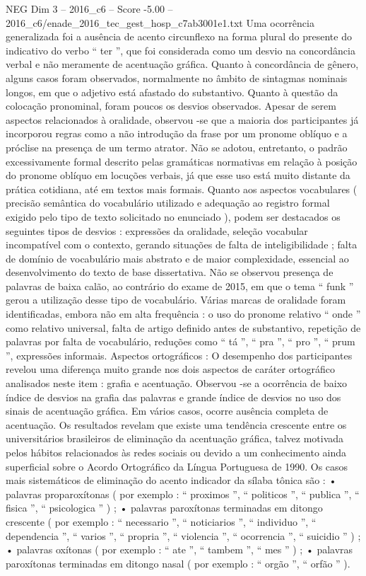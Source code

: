 \begin{textsample}{NEG Dim 3 – 2016\_c6 – Score -5.00 – 2016\_c6/enade\_2016\_tec\_gest\_hosp\_c7ab3001e1.txt}
Uma ocorrência generalizada foi a ausência de acento circunflexo na forma plural do presente do indicativo do verbo “ ter ”, que foi considerada como um desvio na concordância verbal e não meramente de acentuação gráfica.
Quanto à concordância de gênero, alguns casos foram observados, normalmente no âmbito de sintagmas nominais longos, em que o adjetivo está afastado do substantivo.
Quanto à questão da colocação pronominal, foram poucos os desvios observados.
Apesar de serem aspectos relacionados à oralidade, observou -se que a maioria dos participantes já incorporou regras como a não introdução da frase por um pronome oblíquo e a próclise na presença de um termo atrator.
Não se adotou, entretanto, o padrão excessivamente formal descrito pelas gramáticas normativas em relação à posição do pronome oblíquo em locuções verbais, já que esse uso está muito distante da prática cotidiana, até em textos mais formais.
Quanto aos aspectos vocabulares ( precisão semântica do vocabulário utilizado e adequação ao registro formal exigido pelo tipo de texto solicitado no enunciado ), podem ser destacados os seguintes tipos de desvios : expressões da oralidade, seleção vocabular incompatível com o contexto, gerando situações de falta de inteligibilidade ; falta de domínio de vocabulário mais abstrato e de maior complexidade, essencial ao desenvolvimento do texto de base dissertativa.
Não se observou presença de palavras de baixa calão, ao contrário do exame de 2015, em que o tema “ funk ” gerou a utilização desse tipo de vocabulário.
Várias marcas de oralidade foram identificadas, embora não em alta frequência : o uso do pronome relativo “ onde ” como relativo universal, falta de artigo definido antes de substantivo, repetição de palavras por falta de vocabulário, reduções como “ tá ”, “ pra ”, “ pro ”, “ prum ”, expressões informais.
Aspectos ortográficos : O desempenho dos participantes revelou uma diferença muito grande nos dois aspectos de caráter ortográfico analisados neste item : grafia e acentuação.
Observou -se a ocorrência de baixo índice de desvios na grafia das palavras e grande índice de desvios no uso dos sinais de acentuação gráfica.
Em vários casos, ocorre ausência completa de acentuação.
Os resultados revelam que existe uma tendência crescente entre os universitários brasileiros de eliminação da acentuação gráfica, talvez motivada pelos hábitos relacionados às redes sociais ou devido a um conhecimento ainda superficial sobre o Acordo Ortográfico da Língua Portuguesa de 1990.
Os casos mais sistemáticos de eliminação do acento indicador da sílaba tônica são : • palavras proparoxítonas ( por exemplo : “ proximos ”, “ politicos ”, “ publica ”, “ fisica ”, “ psicologica ” ) ; • palavras paroxítonas terminadas em ditongo crescente ( por exemplo : “ necessario ”, “ noticiarios ”, “ individuo ”, “ dependencia ”, “ varios ”, “ propria ”, “ violencia ”, “ ocorrencia ”, “ suicidio ” ) ; • palavras oxítonas ( por exemplo : “ ate ”, “ tambem ”, “ mes ” ) ; • palavras paroxítonas terminadas em ditongo nasal ( por exemplo : “ orgão ”, “ orfão ” ).

\end{textsample}
